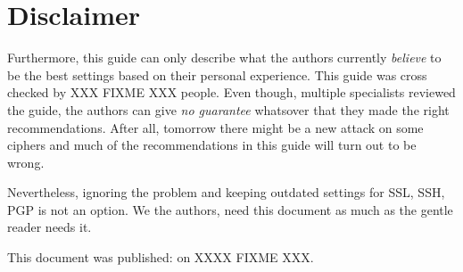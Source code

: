 \section{Disclaimer}
Furthermore, this guide can only describe what the authors currently \emph{believe} to be the best settings based on their personal experience. This guide was cross checked by XXX FIXME XXX people. Even though, multiple specialists reviewed the guide, the authors can give \emph{no guarantee} whatsover that they made the right recommendations. After all, tomorrow there might be a new attack on some ciphers and much of the recommendations in this guide will turn out to be wrong.


Nevertheless, ignoring the problem and keeping outdated settings for SSL, SSH, PGP is not an option. We the authors, need this document as much as the gentle reader needs it.

This document was published: on XXXX FIXME XXX.
